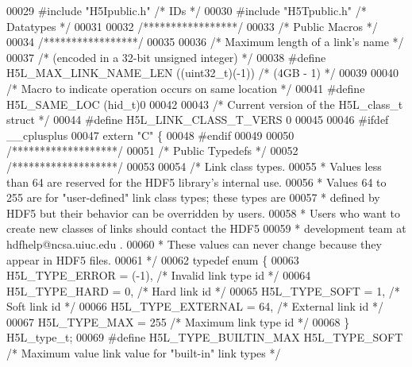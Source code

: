 \begin{DoxyCode}
00029 \textcolor{preprocessor}{#include "H5Ipublic.h"}      \textcolor{comment}{/* IDs                  */}
00030 \textcolor{preprocessor}{#include "H5Tpublic.h"}      \textcolor{comment}{/* Datatypes                */}
00031 
00032 \textcolor{comment}{/*****************/}
00033 \textcolor{comment}{/* Public Macros */}
00034 \textcolor{comment}{/*****************/}
00035 
00036 \textcolor{comment}{/* Maximum length of a link's name */}
00037 \textcolor{comment}{/* (encoded in a 32-bit unsigned integer) */}
00038 \textcolor{preprocessor}{#define H5L\_MAX\_LINK\_NAME\_LEN   ((uint32\_t)(-1))  }\textcolor{comment}{/* (4GB - 1) */}\textcolor{preprocessor}{}
00039 
00040 \textcolor{comment}{/* Macro to indicate operation occurs on same location */}
00041 \textcolor{preprocessor}{#define H5L\_SAME\_LOC (hid\_t)0}
00042 
00043 \textcolor{comment}{/* Current version of the H5L\_class\_t struct */}
00044 \textcolor{preprocessor}{#define H5L\_LINK\_CLASS\_T\_VERS 0}
00045 
00046 \textcolor{preprocessor}{#ifdef \_\_cplusplus}
00047 \textcolor{keyword}{extern} \textcolor{stringliteral}{"C"} \{
00048 \textcolor{preprocessor}{#endif}
00049 
00050 \textcolor{comment}{/*******************/}
00051 \textcolor{comment}{/* Public Typedefs */}
00052 \textcolor{comment}{/*******************/}
00053 
00054 \textcolor{comment}{/* Link class types.}
00055 \textcolor{comment}{ * Values less than 64 are reserved for the HDF5 library's internal use.}
00056 \textcolor{comment}{ * Values 64 to 255 are for "user-defined" link class types; these types are}
00057 \textcolor{comment}{ * defined by HDF5 but their behavior can be overridden by users.}
00058 \textcolor{comment}{ * Users who want to create new classes of links should contact the HDF5}
00059 \textcolor{comment}{ * development team at hdfhelp@ncsa.uiuc.edu .}
00060 \textcolor{comment}{ * These values can never change because they appear in HDF5 files.}
00061 \textcolor{comment}{ */}
00062 \textcolor{keyword}{typedef} \textcolor{keyword}{enum} \{
00063     H5L\_TYPE\_ERROR = (-1),      \textcolor{comment}{/* Invalid link type id         */}
00064     H5L\_TYPE\_HARD = 0,          \textcolor{comment}{/* Hard link id                 */}
00065     H5L\_TYPE\_SOFT = 1,          \textcolor{comment}{/* Soft link id                 */}
00066     H5L\_TYPE\_EXTERNAL = 64,     \textcolor{comment}{/* External link id             */}
00067     H5L\_TYPE\_MAX = 255          \textcolor{comment}{/* Maximum link type id         */}
00068 \} H5L\_type\_t;
00069 \textcolor{preprocessor}{#define H5L\_TYPE\_BUILTIN\_MAX H5L\_TYPE\_SOFT      }\textcolor{comment}{/* Maximum value link value for "built-in" link types */}\textcolor{preprocessor}{}

\end{DoxyCode}
